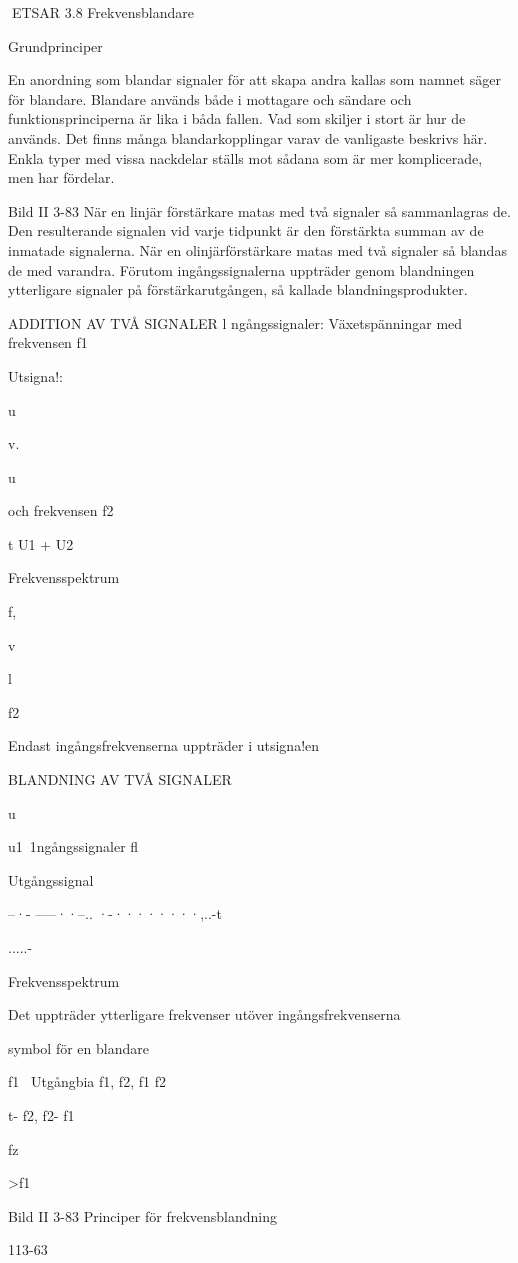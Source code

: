 {{{ETSAR
3.8 Frekvensblandare

Grundprinciper

En anordning som blandar signaler för att
skapa andra kallas som namnet säger för
blandare. Blandare används både i mottagare och sändare och funktionsprinciperna
är lika i båda fallen. Vad som skiljer i stort är
hur de används.
Det finns många blandarkopplingar varav de vanligaste beskrivs här. Enkla typer
med vissa nackdelar ställs mot sådana som
är mer komplicerade, men har fördelar.

Bild II 3-83
När en linjär förstärkare matas med två
signaler så sammanlagras de. Den resulterande signalen vid varje tidpunkt är den
förstärkta summan av de inmatade signalerna.
När en olinjärförstärkare matas med två
signaler så blandas de med varandra. Förutom ingångssignalerna uppträder genom
blandningen ytterligare signaler på förstärkarutgången, så kallade blandningsprodukter.

ADDITION AV TVÅ SIGNALER
l ngångssignaler:
Växetspänningar med frekvensen f1

Utsigna!:

u

v.

u

och frekvensen f2

t U1 + U2

Frekvensspektrum

f,

v

l

f2

Endast ingångsfrekvenserna
uppträder i utsigna!en

BLANDNING AV TVÅ SIGNALER

u

u1~1ngångssignaler
fl

Utgångssignal

--·- -----··--.. ·-········,..-t

.....-

Frekvensspektrum

Det uppträder ytterligare frekvenser
utöver ingångsfrekvenserna

symbol för en blandare

f1~ Utgångbia f1, f2, f1
f2

t- f2, f2- f1

fz

>f1

Bild II 3-83 Principer för frekvensblandning

113-63

}}}
